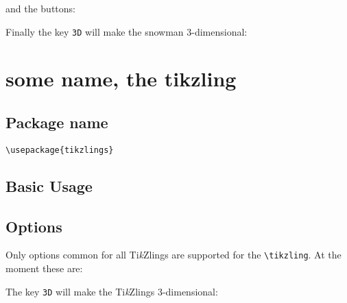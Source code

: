 \documentclass[parskip=half]{scrartcl}
\newcommand{\tikzlings}{Ti\emph{k}Zlings\xspace}
\begin{document}
\begin{tcblisting}{}
\snowman[mouth=red]
\end{tcblisting}

and the buttons:

\begin{tcblisting}{}
\snowman[buttons=red]
\end{tcblisting}

Finally the key \lstinline|3D| will make the snowman 3-dimensional:

\begin{tcblisting}{}
\snowman[3D]
\end{tcblisting}

\clearpage
\section[Ti\emph{k}Zlings]{some name, the tikzling}

\subsection{Package name}

\begin{tcolorbox}[lower separated=false, lefthand width=.8\linewidth]
\vspace*{0.5cm}
\lstinline|\usepackage{tikzlings}|
\vspace*{0.5cm}
\end{tcolorbox}

\subsection{Basic Usage}

\begin{tcblisting}{}
\tikzling
\end{tcblisting}

\subsection{Options}

Only options common for all \tikzlings are supported for the \lstinline|\tikzling|. At the moment these are: 

\begin{tcblisting}{}
\tikzling[body=SteelBlue]
\end{tcblisting}

The key \lstinline|3D| will make the Ti\emph{k}Zlings 3-dimensional:
\end{document}
